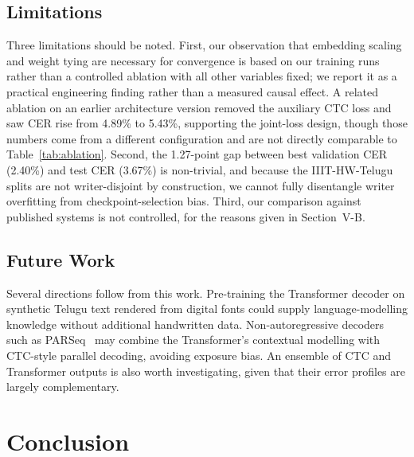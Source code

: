 \documentclass[conference]{IEEEtran}
\begin{document}
\subsection{Limitations}

Three limitations should be noted. First, our observation that embedding scaling and weight tying are necessary for convergence is based on our training runs rather than a controlled ablation with all other variables fixed; we report it as a practical engineering finding rather than a measured causal effect. A related ablation on an earlier architecture version removed the auxiliary CTC loss and saw CER rise from 4.89\% to 5.43\%, supporting the joint-loss design, though those numbers come from a different configuration and are not directly comparable to Table~\ref{tab:ablation}. Second, the 1.27-point gap between best validation CER (2.40\%) and test CER (3.67\%) is non-trivial, and because the IIIT-HW-Telugu splits are not writer-disjoint by construction, we cannot fully disentangle writer overfitting from checkpoint-selection bias. Third, our comparison against published systems is not controlled, for the reasons given in Section~V-B.

\subsection{Future Work}

Several directions follow from this work. Pre-training the Transformer decoder on synthetic Telugu text rendered from digital fonts could supply language-modelling knowledge without additional handwritten data. Non-autoregressive decoders such as PARSeq~\cite{bautista2022parseq} may combine the Transformer's contextual modelling with CTC-style parallel decoding, avoiding exposure bias. An ensemble of CTC and Transformer outputs is also worth investigating, given that their error profiles are largely complementary.

\section{Conclusion}
\end{document}
